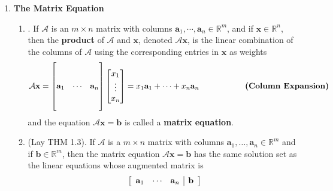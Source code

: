 \documentclass[12pt]{article}
\begin{document}
\begin{enumerate}
\begin{enumerate}
\newpage
	
	\end{enumerate}


\item\textbf{The Matrix Equation}
	\begin{enumerate}
	\item\underline{}.
		If $\mathcal{A}$ is an $m\times n$ matrix with columns $\mathbf{{a}}_1,\cdots,\mathbf{{a}}_n \in \mathbb{R}^m$, and if $\mathbf{{x}}\in\mathbb{R}^n$,
		then the \textbf{product} of $\mathcal{A}$ and $\mathbf{{x}}$, denoted $\mathcal{A}\mathbf{{x}}$, is the linear combination of the columns of $\mathcal{A}$ using the corresponding entries in $\mathbf{x}$ as weights
			\[ \mathcal{A}\mathbf{{x}}=\begin{bmatrix} & & \\  & & \\ \mathbf{{a}}_1&\cdots&\mathbf{{a}}_n \\  & & \\  & & \end{bmatrix}
				\begin{bmatrix}x_1 \\ \vdots \\ x_n\end{bmatrix}
				=x_1\mathbf{{a}}_1+\cdots+x_n\mathbf{{a}}_n \hspace{20mm} \text{\bf (Column Expansion)} \]
		and the equation $\mathcal{A}\mathbf{{x}}=\mathbf{{b}}$ is called a \textbf{matrix equation}.

	\item\underline{} (Lay THM 1.3).
		If $\mathcal{A}$ is a $m\times n$ matrix with columns $\mathbf{a}_1,\dots,\mathbf{a}_n \in \mathbb{R}^m$ and if $\mathbf{b}\in\mathbb{R}^m$, then the
		matrix equation $\mathcal{A}\mathbf{x}=\mathbf{b}$ has the same solution set as the linear equations whose augmented matrix
		is \[\left[\begin{array}{c c c | c}\mathbf{a}_1&\cdots&\mathbf{a}_n&\mathbf{b}\end{array}\right]\]


\end{enumerate}
\end{enumerate}
\end{document}
